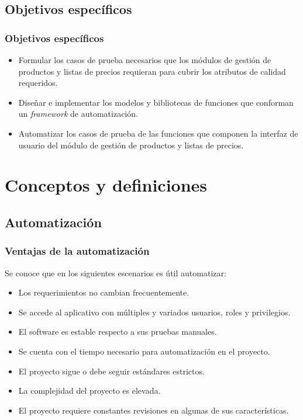 \documentclass{beamer}
\begin{document}
\subsection{Objetivos específicos}

\begin{frame}
\frametitle{Objetivos específicos}
\begin{itemize}
\item \small{Formular los casos de prueba necesarios que los módulos de gestión
de productos y listas de precios requieran para cubrir los atributos de calidad
requeridos.}
\item Diseñar e implementar los modelos y bibliotecas de funciones que
    conforman un \emph{framework} de automatización.
\item Automatizar los casos de prueba de las funciones que componen la interfaz
    de usuario del módulo de gestión de productos y listas de precios.
\end{itemize}
\end{frame}

\section{Conceptos y definiciones}

\subsection{Automatización}

\begin{frame}
\frametitle{Ventajas de la automatización}
Se conoce que en los siguientes escenarios es útil automatizar:
\begin{itemize}
    \item Los requerimientos no cambian frecuentemente.
    \item Se accede al aplicativo con múltiples y variados usuarios, roles y
        privilegios.
    \item El software es estable respecto a sus pruebas manuales.
    \item Se cuenta con el tiempo necesario para automatización en el proyecto.
    \item El proyecto sigue o debe seguir estándares estrictos.
    \item La complejidad del proyecto es elevada.
    \item El proyecto requiere constantes revisiones en algunas de sus
    características.
\end{itemize}
\end{frame}
\end{document}
